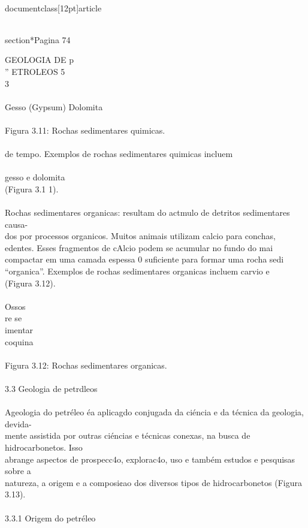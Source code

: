 \\documentclass[12pt]{article}
\begin{document}
\\section*{Pagina 74}

GEOLOGIA DE p\\
” ETROLEOS 5\\
3\\
\\
Gesso (Gypsum) Dolomita\\
\\
Figura 3.11: Rochas sedimentares quimicas.\\
\\
de tempo. Exemplos de rochas sedimentares quimicas incluem\\
\\
gesso e dolomita\\
(Figura 3.1 1).\\
\\
Rochas sedimentares organicas: resultam do actmulo de detritos sedimentares causa-\\
dos por processos organicos. Muitos animais utilizam calcio para conchas,\\
edentes. Esses fragmentos de cAlcio podem se acumular no fundo do mai\\
compactar em uma camada espessa 0 suficiente para formar uma rocha sedi\\
“organica”. Exemplos de rochas sedimentares organicas incluem carvio e\\
(Figura 3.12).\\
\\
Ossos\\
re se\\
imentar\\
coquina\\
\\
Figura 3.12: Rochas sedimentares organicas.\\
\\
3.3 Geologia de petrdleos\\
\\
Ageologia do petréleo éa aplicagdo conjugada da ciéncia e da técnica da geologia, devida-\\
mente assistida por outras ciéncias e técnicas conexas, na busca de hidrocarbonetos. Isso\\
abrange aspectos de prospecc4o, explorac4o, uso e também estudos e pesquisas sobre a\\
natureza, a origem e a composi¢ao dos diversos tipos de hidrocarbonetos (Figura 3.13).\\
\\
3.3.1 Origem do petréleo\\
\end{document}
